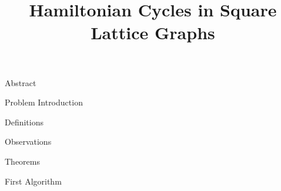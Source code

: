 \documentclass[a4paper,12pt]{article}
\title{Hamiltonian Cycles in Square Lattice Graphs}
\begin{document}
\date{\vspace{-5ex}}
\maketitle
\tableofcontents
\doublespacing

 {Abstract}

 {Problem Introduction}

 {Definitions}

 {Observations}

 {Theorems}

 {First Algorithm}

\pagebreak
\nocite{*}
\printbibliography
\end{document}
